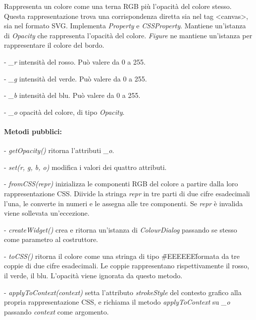 Rappresenta un colore come una terna RGB pi\`u l'opacit\`a del colore stesso. Questa rappresentazione trova una corrispondenza diretta sia nel tag <canvas>, sia nel formato SVG.
Implementa \textit{Property} e \textit{CSSProperty}. Mantiene un'istanza di \textit{Opacity} che rappresenta l'opacit\`a del colore.
\textit{Figure} ne mantiene un'istanza per rappresentare il colore del bordo.
\begin{elencopuntato}[\normindent]
\item[-] \textit{\_r} intensit\`a del rosso. Pu\`o valere da 0 a 255.
\item[-] \textit{\_g} intensit\`a del verde. Pu\`o valere da 0 a 255.
\item[-] \textit{\_b} intensit\`a del blu. Pu\`o valere da 0 a 255.
\item[-] \textit{\_o} opacit\`a del colore, di tipo \textit{Opacity}.
\end{elencopuntato}
\paragraph{Metodi pubblici:}
\begin{elencopuntato}[\normindent]
\item[-] \textit{getOpacity()} ritorna l'attributi \textit{{\_}o}.
\item[-] \textit{set(r, g, b, o)} modifica i valori dei quattro attributi.
\item[-] \textit{fromCSS(repr)} inizializza le componenti RGB del colore a partire dalla loro rappresentazione CSS. Diivide la stringa \textit{repr} in tre parti di due cifre esadecimali l'una, le converte in numeri e le assegna alle tre componenti. Se \textit{repr} \`e invalida viene sollevata un'eccezione.
\item[-] \textit{createWidget()} crea e ritorna un'istanza di \textit{ColourDialog} passando se stesso come parametro al costruttore.
\item[-] \textit{toCSS()} ritorna il colore come una stringa di tipo \"{\#}EEEEEE\" formata da tre coppie di due cifre esadecimali. Le coppie rappresentano rispettivamente il rosso, il verde, il blu. L'opacit\`a viene ignorata da questo metodo.
\item[-] \textit{applyToContext(context)} setta l'attributo \textit{strokeStyle} del contesto grafico alla propria rappresentazione CSS, e richiama il metodo \textit{applyToContext} su \textit{{\_}o} passando \textit{context} come argomento.
\end{elencopuntato}

